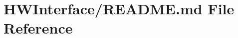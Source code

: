 \hypertarget{_h_w_interface_2_r_e_a_d_m_e_8md}{\section{H\-W\-Interface/\-R\-E\-A\-D\-M\-E.md File Reference}
\label{_h_w_interface_2_r_e_a_d_m_e_8md}
}
